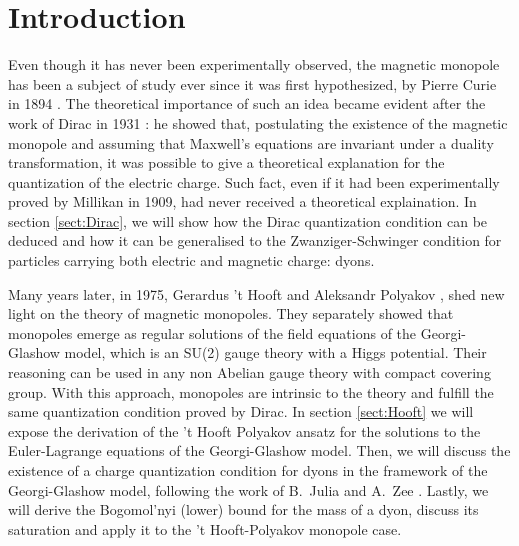 \documentclass[main.tex]{subfiles}
\begin{document}
\section{Introduction}

Even though it has never been experimentally observed, the magnetic monopole has been a subject of study ever since it was first hypothesized, by Pierre Curie in 1894 \cite{Curie:Monopole}.
The theoretical importance of such an idea became evident after the work of Dirac in 1931 \cite{Dirac}: he showed that, postulating the existence of the magnetic monopole and assuming that Maxwell's equations are invariant under a duality transformation, it was possible to give a theoretical explanation for the quantization of the electric charge.
Such fact, even if it had been experimentally proved by Millikan in 1909, had never received a theoretical explaination.
In section \ref{sect:Dirac}, we will show how the Dirac quantization condition can be deduced and how it can be generalised to the Zwanziger-Schwinger condition for particles carrying both electric and magnetic charge: dyons.

Many years later, in 1975, Gerardus 't Hooft \cite{Hof:Mon} and Aleksandr Polyakov \cite{Pol:Mon}, shed new light on the theory of magnetic monopoles.
They separately showed that monopoles emerge as regular solutions of the field equations of the Georgi-Glashow model, which is an SU(2) gauge theory with a Higgs potential.
Their reasoning can be used in any non Abelian gauge theory with compact covering group.
With this approach, monopoles are intrinsic to the theory and fulfill the same quantization condition proved by Dirac.
In section \ref{sect:Hooft} we will expose the derivation of the 't Hooft Polyakov ansatz for the solutions to the Euler-Lagrange equations of the Georgi-Glashow model.
Then, we will discuss the existence of a charge quantization condition for dyons in the framework of the Georgi-Glashow model, following the work of B.\ Julia and A.\ Zee \cite{Julia:Dyon}.
Lastly, we will derive the Bogomol'nyi (lower) bound for the mass of a dyon, discuss its saturation and apply it to the 't Hooft-Polyakov monopole case. 

\end{document}
